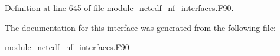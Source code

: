 Definition at line 645 of file module\+\_\+netcdf\+\_\+nf\+\_\+interfaces.\+F90.



The documentation for this interface was generated from the following file\+:\begin{DoxyCompactItemize}
\item 
\hyperlink{module__netcdf__nf__interfaces_8F90}{module\+\_\+netcdf\+\_\+nf\+\_\+interfaces.\+F90}\end{DoxyCompactItemize}
